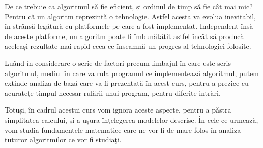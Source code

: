 De ce trebuie ca algoritmul să fie eficient, și ordinul de timp să fie cât mai mic? Pentru că un algoritm reprezintă o tehnologie. Astfel acesta va evolua inevitabil, în strânsă legătură cu platformele pe care a fost implementat. Independent însă de aceste platforme, un algoritm poate fi îmbunătățit astfel încât să producă aceleași rezultate mai rapid ceea ce înseamnă un progres al tehnologiei folosite.


Luând în considerare o serie de factori precum limbajul în care este scris algoritmul, mediul în care va rula programul ce implementează algoritmul, putem extinde analiza de bază care va fi prezentată în acest curs, pentru a prezice cu acurateţe timpul necesar rulării unui program, pentru diferite intrări. 

Totuși, în cadrul acestui curs vom ignora aceste aspecte, pentru a păstra simplitatea calcului, și a ușura înţelegerea modelelor descrise. În cele ce urmează, vom studia fundamentele matematice care ne vor fi de mare folos în analiza tuturor algoritmilor ce vor fi studiaţi.

